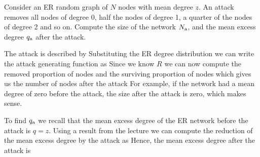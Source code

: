
\label{exAttackAbsTarg}Consider an ER random graph of $N$ nodes with mean degree $z$. An attack removes all nodes of degree 0, half the nodes of degree 1, a quarter of the nodes of degree 2 and so on. Compute the size of the network $N_{\rm a}$, and the mean excess degree $q_{\rm a}$ after the attack. 

\solution 
The attack is described by 
Substituting the ER degree distribution 
we can write the attack generating function as 
Since we know $R$ we can now compute the removed proportion of nodes 
and the surviving proportion of nodes 
which gives us the number of nodes after the attack
For example, if the network had a mean degree of zero before the attack, the size after the attack is zero, which makes sense. 

To find $q_{\rm a}$ we recall that the mean excess degree of the ER network before the attack is $q=z$. Using a result from the lecture we can compute the reduction of the mean excess degree by the attack as 
Hence, the mean excess degree after the attack is 
